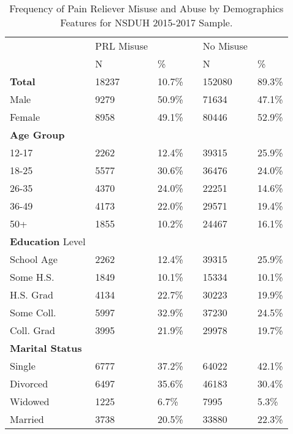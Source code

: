 \documentclass[sigconf]{acmart}
\begin{document}
\begin{table}
  \caption{Frequency of Pain Reliever Misuse and Abuse
  by Demographics Features for NSDUH 2015-2017 Sample.}
  \label{tab:freq}
  \begin{tabular}{llllll}
    \toprule
              & PRL Misuse & & & No Misuse & \\
              & N & \% &  & N & \% \\
    \midrule
    \textbf{Total}     & 18237 & 10.7\% & & 152080 & 89.3\% \\
    Male      & 9279 & 50.9\% & & 71634 & 47.1\%  \\
    Female    & 8958 & 49.1\% & & 80446 & 52.9\%  \\
    \midrule
    \textbf{Age Group} &  &  &  &  & \\
    12-17     & 2262 & 12.4\% & & 39315 & 25.9\% \\
    18-25     & 5577 & 30.6\% & & 36476 & 24.0\% \\
    26-35     & 4370 & 24.0\% & & 22251 & 14.6\% \\
    36-49     & 4173 & 22.0\% & & 29571 & 19.4\% \\
    50+       & 1855 & 10.2\% & & 24467 & 16.1\% \\
    \midrule
    \textbf{Education} Level &  &  &  &  & \\
    School Age & 2262 & 12.4\% & & 39315 & 25.9\% \\
    Some H.S.  & 1849 & 10.1\% & & 15334 & 10.1\% \\
    H.S. Grad  & 4134 & 22.7\% & & 30223 & 19.9\% \\
    Some Coll. & 5997 & 32.9\% & & 37230 & 24.5\% \\
    Coll. Grad & 3995 & 21.9\% & & 29978 & 19.7\% \\
    \midrule
    \textbf{Marital Status} &  &  &  &  & \\
    Single    & 6777 & 37.2\% & & 64022 & 42.1\% \\
    Divorced  & 6497 & 35.6\% & & 46183 & 30.4\% \\
    Widowed   & 1225 &  6.7\% & &  7995 &  5.3\% \\
    Married   & 3738 & 20.5\% & & 33880 & 22.3\% \\
    
    \bottomrule
  \end{tabular}
\end{table}

\end{document}
